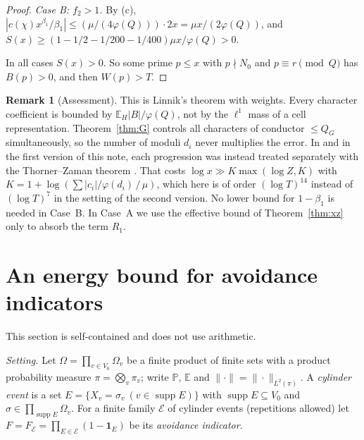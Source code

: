 \documentclass[11pt,reqno]{amsart}
\theoremstyle{definition}
\newtheorem{remark}[theorem]{Remark}
\newcommand{\cE}{\mathcal E}
\newcommand{\E}{\mathbb E}
\newcommand{\PP}{\mathbb P}
\newcommand{\supp}{\operatorname{supp}}
\begin{document}
\begin{proof}
\emph{Case B: $f_2>1$.}  By (c),
$|c(\chi)x^{\beta_1}/\beta_1|\le(\mu/(4\varphi(Q)))\cdot2x=\mu x/(2\varphi(Q))$, and
$S(x)\ge(1-1/2-1/200-1/400)\mu x/\varphi(Q)>0$.

In all cases $S(x)>0$.  So some prime $p\le x$ with $p\nmid N_0$ and
$p\equiv r\pmod Q$ has $B(p)>0$, and then $W(p)>T$.
\end{proof}

\begin{remark}[Assessment]\label{rem:linear}
This is Linnik's theorem with weights.  Every character coefficient is
bounded by $\E_H|B|/\varphi(Q)$, not by the $\ell^1$ mass of a cell
representation.  Theorem~\ref{thm:G} controls all characters of conductor
$\le Q_G$ simultaneously, so the number of moduli $d_i$ never multiplies the
error.  In \cite{Paper1} and in the first version of this note, each
progression was instead treated separately with the Thorner--Zaman theorem
\cite{TZ}.  That costs $\log x\gg K\max(\log Z,K)$ with
$K=1+\log(\sum|c_i|/\varphi(d_i)\,/\,\mu)$, which here is of order
$(\log T)^{14}$ instead of $(\log T)^7$ in the setting of the second
version.  No lower bound for $1-\beta_1$ is
needed in Case~B.  In Case~A we use the effective bound of
Theorem~\ref{thm:xz} only to absorb the term $R_1$.
\end{remark}
\section{An energy bound for avoidance indicators}\label{sec:energy}

This section is self-contained and does not use arithmetic.

\emph{Setting.}  Let $\Omega=\prod_{v\in V_0}\Omega_v$ be a finite product of
finite sets with a product probability measure $\pi=\bigotimes_v\pi_v$; write
$\PP$, $\E$ and $\|\cdot\|=\|\cdot\|_{L^2(\pi)}$.  A \emph{cylinder event} is a set
$E=\{X_v=\sigma_v\ (v\in\supp E)\}$ with $\supp E\subseteq V_0$ and
$\sigma\in\prod_{\supp E}\Omega_v$.  For a finite family $\cE$ of cylinder events
(repetitions allowed) let $F=F_\cE=\prod_{E\in\cE}(1-\mathbf 1_E)$ be its
\emph{avoidance indicator}.
\end{document}
